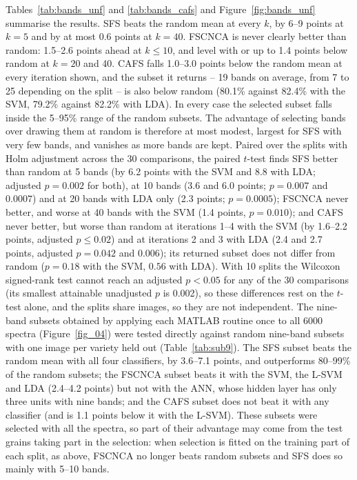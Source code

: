 \documentclass[final,5p,times,twocolumn]{elsarticle}
\newcommand{\added}[1]{{\color{blue}#1}}
\begin{document}
\added{Tables~\ref{tab:bands_unf} and \ref{tab:bands_cafs} and Figure~\ref{fig:bands_unf} summarise the results. SFS beats the random mean at every $k$, by 6--9 points at $k=5$ and by at most 0.6 points at $k=40$. FSCNCA is never clearly better than random: 1.5--2.6 points ahead at $k\le10$, and level with or up to 1.4 points below random at $k=20$ and 40. CAFS falls 1.0--3.0 points below the random mean at every iteration shown, and the subset it returns -- 19 bands on average, from 7 to 25 depending on the split -- is also below random (80.1\% against 82.4\% with the SVM, 79.2\% against 82.2\% with LDA). In every case the selected subset falls inside the 5--95\% range of the random subsets. The advantage of selecting bands over drawing them at random is therefore at most modest, largest for SFS with very few bands, and vanishes as more bands are kept. Paired over the splits with Holm adjustment across the 30 comparisons, the paired $t$-test finds SFS better than random at 5 bands (by 6.2 points with the SVM and 8.8 with LDA; adjusted $p=0.002$ for both), at 10 bands (3.6 and 6.0 points; $p=0.007$ and $0.0007$) and at 20 bands with LDA only (2.3 points; $p=0.0005$); FSCNCA never better, and worse at 40 bands with the SVM (1.4 points, $p=0.010$); and CAFS never better, but worse than random at iterations 1--4 with the SVM (by 1.6--2.2 points, adjusted $p\le0.02$) and at iterations 2 and 3 with LDA (2.4 and 2.7 points, adjusted $p=0.042$ and $0.006$); its returned subset does not differ from random ($p=0.18$ with the SVM, $0.56$ with LDA). With 10 splits the Wilcoxon signed-rank test cannot reach an adjusted $p<0.05$ for any of the 30 comparisons (its smallest attainable unadjusted $p$ is 0.002), so these differences rest on the $t$-test alone, and the splits share images, so they are not independent.}
\added{The nine-band subsets obtained by applying each MATLAB routine once to all 6000 spectra (Figure~\ref{fig_04}) were tested directly against random nine-band subsets with one image per variety held out (Table~\ref{tab:sub9}). The SFS subset beats the random mean with all four classifiers, by 3.6--7.1 points, and outperforms 80--99\% of the random subsets; the FSCNCA subset beats it with the SVM, the L-SVM and LDA (2.4--4.2 points) but not with the ANN, whose hidden layer has only three units with nine bands; and the CAFS subset does not beat it with any classifier (and is 1.1 points below it with the L-SVM). These subsets were selected with all the spectra, so part of their advantage may come from the test grains taking part in the selection: when selection is fitted on the training part of each split, as above, FSCNCA no longer beats random subsets and SFS does so mainly with 5--10 bands.}
\end{document}
